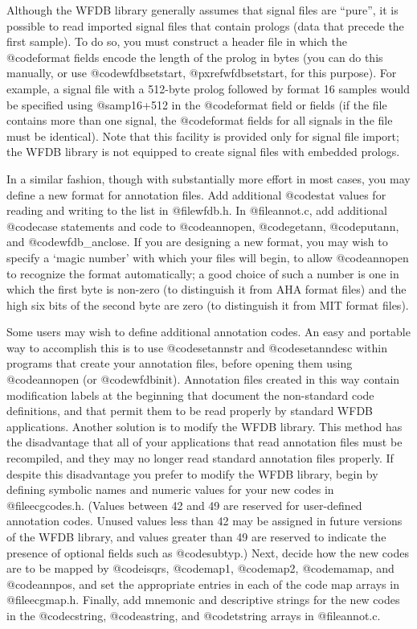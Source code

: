 {{{{{{{{{Although the WFDB library generally assumes that signal files are ``pure'', it
is possible to read imported signal files that contain prologs (data that
precede the first sample).  To do so, you must construct a header file in which
the @code{format} fields encode the length of the prolog in bytes (you can do
this manually, or use @code{wfdbsetstart}, @pxref{wfdbsetstart}, for this
purpose).  For example, a signal file with a 512-byte prolog followed by format
16 samples would be specified using @samp{16+512} in the @code{format} field or
fields (if the file contains more than one signal, the @code{format} fields for
all signals in the file must be identical).  Note that this facility is
provided only for signal file import; the WFDB library is not equipped to
create signal files with embedded prologs.

In a similar fashion, though with substantially more effort in most
cases, you may define a new format for annotation files.  Add additional
@code{stat} values for reading and writing to the list in @file{wfdb.h}.
In @file{annot.c}, add additional @code{case} statements and code to
@code{annopen}, @code{getann}, @code{putann}, and @code{wfdb_anclose}.  If
you are designing a new format, you may wish to specify a `magic number'
with which your files will begin, to allow @code{annopen} to recognize
the format automatically; a good choice of such a number is one in which
the first byte is non-zero (to distinguish it from AHA format files) and
the high six bits of the second byte are zero (to distinguish it from MIT
format files).

Some users may wish to define additional annotation codes.  An easy and
portable way to accomplish this is to use @code{setannstr} and
@code{setanndesc} within programs that create your annotation files,
before opening them using @code{annopen} (or @code{wfdbinit}).  Annotation
files created in this way contain modification labels at the beginning
that document the non-standard code definitions, and that permit them to
be read properly by standard WFDB applications.  Another solution is to
modify the WFDB library.  This method has the disadvantage that all of
your applications that read annotation files must be recompiled, and
they may no longer read standard annotation files properly.  If despite
this disadvantage you prefer to modify the WFDB library, begin by defining
symbolic names and numeric values for your new codes in
@file{ecgcodes.h}.  (Values between 42 and 49 are reserved for
user-defined annotation codes.  Unused values less than 42 may be
assigned in future versions of the WFDB library, and values greater than
49 are reserved to indicate the presence of optional fields such as
@code{subtyp}.)  Next, decide how the new codes are to be mapped by
@code{isqrs}, @code{map1}, @code{map2}, @code{mamap}, and @code{annpos},
and set the appropriate entries in each of the code map arrays in
@file{ecgmap.h}.  Finally, add mnemonic and descriptive strings for the
new codes in the @code{cstring}, @code{astring}, and @code{tstring}
arrays in @file{annot.c}.

}}}}}}}}}
